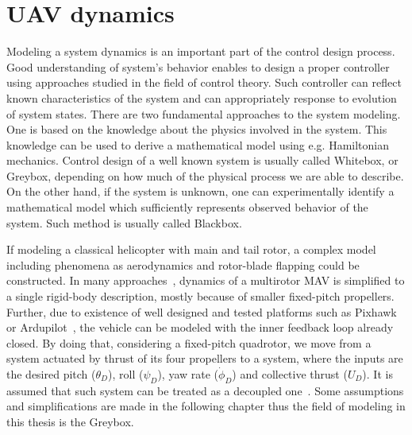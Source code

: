 \section{UAV dynamics}
\label{chap:uav_dynamics}

Modeling a system dynamics is an important part of the control design process. Good understanding of system's behavior enables to design a proper controller using approaches studied in the field of control theory. Such controller can reflect known characteristics of the system and can appropriately response to evolution of system states. There are two fundamental approaches to the system modeling. One is based on the knowledge about the physics involved in the system. This knowledge can be used to derive a mathematical model using e.g. Hamiltonian mechanics. Control design of a well known system is usually called Whitebox, or Greybox, depending on how much of the physical process we are able to describe. On the other hand, if the system is unknown, one can experimentally identify a mathematical model which sufficiently represents observed behavior of the system. Such method is usually called Blackbox.

If modeling a classical helicopter with main and tail rotor, a complex model including phenomena as aerodynamics and rotor-blade flapping could be constructed. In many approaches~\citep{alexis2014rmpc, mahony2012multirotor}, dynamics of a multirotor MAV is simplified to a single rigid-body description, mostly because of smaller fixed-pitch propellers. Further, due to existence of well designed and tested platforms such as Pixhawk~\citep{pixhawk} or Ardupilot~\citep{ardupilot}, the vehicle can be modeled with the inner feedback loop already closed. By doing that, considering a fixed-pitch quadrotor, we move from a system actuated by thrust of its four propellers to a system, where the inputs are the desired pitch ($\theta_D$), roll ($\psi_D$), yaw rate ($\dot{\phi}_D$) and collective thrust ($U_D$). It is assumed that such system can be treated as a decoupled one~\citep{mahony2012multirotor}. Some assumptions and simplifications are made in the following chapter thus the field of modeling in this thesis is the Greybox.


